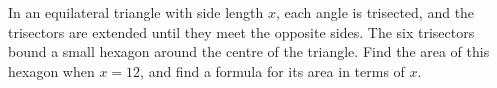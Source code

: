 In an equilateral triangle with side length $x$, each angle is trisected, and the trisectors are extended until they meet the opposite sides. The six trisectors bound a small hexagon around the centre of the triangle. Find the area of this hexagon when $x=12$, and find a formula for its area in terms of $x$.
